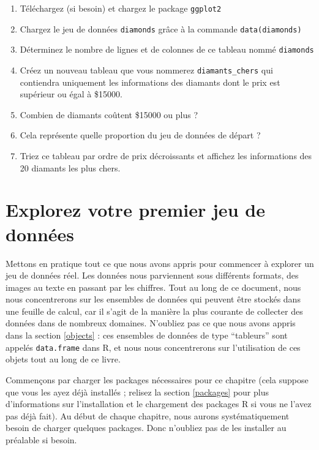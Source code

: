 \documentclass[
  a4paper,
]{article}
\providecommand{\tightlist}{%
  \setlength{\itemsep}{0pt}\setlength{\parskip}{0pt}}
\begin{document}
\begin{enumerate}
\def\labelenumi{\arabic{enumi}.}
\tightlist
\item
  Téléchargez (si besoin) et chargez le package \texttt{ggplot2}
\item
  Chargez le jeu de données \texttt{diamonds} grâce à la commande \texttt{data(diamonds)}
\item
  Déterminez le nombre de lignes et de colonnes de ce tableau nommé \texttt{diamonds}
\item
  Créez un nouveau tableau que vous nommerez \texttt{diamants\_chers} qui contiendra uniquement les informations des diamants dont le prix est supérieur ou égal à \$15000.
\item
  Combien de diamants coûtent \$15000 ou plus ?
\item
  Cela représente quelle proportion du jeu de données de départ ?
\item
  Triez ce tableau par ordre de prix décroissants et affichez les informations des 20 diamants les plus chers.
\end{enumerate}

\hypertarget{dataset}{%
\section{Explorez votre premier jeu de données}\label{dataset}}

Mettons en pratique tout ce que nous avons appris pour commencer à explorer un jeu de données réel. Les données nous parviennent sous différents formats, des images au texte en passant par les chiffres. Tout au long de ce document, nous nous concentrerons sur les ensembles de données qui peuvent être stockés dans une feuille de calcul, car il s'agit de la manière la plus courante de collecter des données dans de nombreux domaines. N'oubliez pas ce que nous avons appris dans la section \ref{objects} : ces ensembles de données de type ``tableurs'' sont appelés \texttt{data.frame} dans R, et nous nous concentrerons sur l'utilisation de ces objets tout au long de ce livre.

Commençons par charger les packages nécessaires pour ce chapitre (cela suppose que vous les ayez déjà installés ; relisez la section \ref{packages} pour plus d'informations sur l'installation et le chargement des packages R si vous ne l'avez pas déjà fait). Au début de chaque chapitre, nous aurons systématiquement besoin de charger quelques packages. Donc n'oubliez pas de les installer au préalable si besoin.
\end{document}
